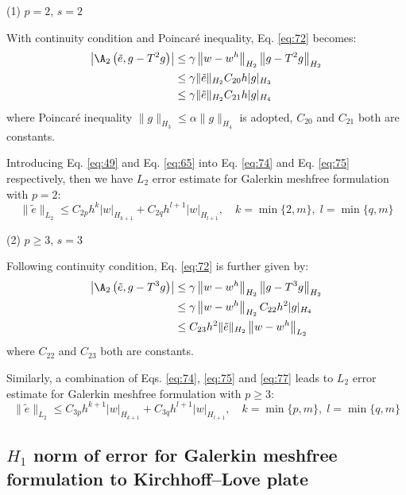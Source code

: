 \noindent (1) $p=2$, $s=2$

With continuity condition and Poincar\'e inequality, Eq. \eqref{eq:72} becomes:
\begin{equation}\label{eq:75}
\begin{aligned}
\left|\A_2\left(\tilde{e},g-T^{2}g\right)\right|&\le\gamma\left\|w-w^{h}\right\|_{H_2}\left\|g-T^{2}g\right\|_{H_2}\\
&\le\gamma\|\tilde{e}\|_{H_2}C_{20}h|g|_{H_3}\\
&\le\gamma\|\tilde{e}\|_{H_2}C_{21}h|g|_{H_4}
\end{aligned}
\end{equation}
where Poincar\'e inequality $\|g\|_{H_3}\le\alpha\|g\|_{H_4}$ is adopted, $C_{20}$ and $C_{21}$ both are constants.

Introducing Eq. \eqref{eq:49} and Eq. \eqref{eq:65} into Eq. \eqref{eq:74} and Eq. \eqref{eq:75} respectively, then we have $L_2$ error estimate for Galerkin meshfree formulation with $p=2$:
\begin{equation}\label{eq:76}
\|\tilde{e}\|_{L_2}\le C_{2p}h^{k}|w|_{H_{k+1}}+C_{2q}h^{l+1}|w|_{H_{l+1}},\quad k=\min\{2,m\},\;l=\min\{q,m\}
\end{equation}

\noindent (2) $p\ge3$, $s=3$

Following continuity condition, Eq. \eqref{eq:72} is further given by:
\begin{equation}\label{eq:77}
\begin{aligned}
\left|\A_2\left(\tilde{e},g-T^{3}g\right)\right|&\le\gamma\left\|w-w^{h}\right\|_{H_2}\left\|g-T^{3}g\right\|_{H_2}\\
&\le\gamma\left\|w-w^{h}\right\|_{H_2}C_{22}h^{2}|g|_{H_4}\\
&\le C_{23}h^{2}\|\tilde{e}\|_{H_2}\left\|w-w^{h}\right\|_{L_2}
\end{aligned}
\end{equation}
where $C_{22}$ and $C_{23}$ both are constants.

Similarly, a combination of Eqs. \eqref{eq:74}, \eqref{eq:75} and \eqref{eq:77} leads to $L_2$ error estimate for Galerkin meshfree formulation with $p\ge3$:
\begin{equation}\label{eq:78}
\|\tilde{e}\|_{L_2}\le C_{3p}h^{k+1}|w|_{H_{k+1}}+C_{3q}h^{l+1}|w|_{H_{l+1}},\quad k=\min\{p,m\},\;l=\min\{q,m\}
\end{equation}

\subsection{$H_1$ norm of error for Galerkin meshfree formulation to Kirchhoff--Love plate}\label{sec:h1}


